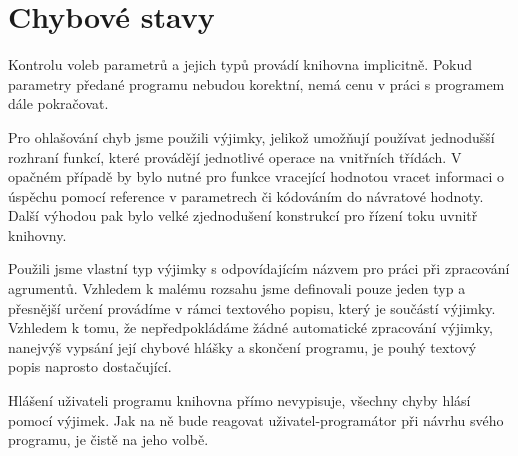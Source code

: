 \documentclass[a4paper,10pt]{article}
\begin{document}
\section*{Chybové stavy}

Kontrolu voleb parametrů a jejich typů provádí knihovna implicitně. Pokud parametry předané programu nebudou
korektní, nemá cenu v práci s programem dále pokračovat.

Pro ohlašování chyb jsme použili výjimky, jelikož umožňují používat jednodušší rozhraní funkcí, které provádějí
jednotlivé operace na vnitřních třídách. V opačném případě by bylo nutné pro funkce vracející hodnotou vracet
informaci o úspěchu pomocí reference v parametrech či kódováním do návratové hodnoty. Další výhodou pak bylo
velké zjednodušení konstrukcí pro řízení toku uvnitř knihovny.

Použili jsme vlastní typ výjimky s odpovídajícím názvem pro práci při zpracování agrumentů.
Vzhledem k malému rozsahu jsme definovali pouze jeden typ a přesnější určení provádíme v rámci textového popisu,
který je součástí výjimky. Vzhledem k tomu, že nepředpokládáme žádné automatické zpracování výjimky, nanejvýš
vypsání její chybové hlášky a skončení programu, je pouhý textový popis naprosto dostačující.

Hlášení uživateli programu knihovna přímo nevypisuje, všechny chyby hlásí pomocí výjimek. Jak na ně bude reagovat
uživatel-programátor při návrhu svého programu, je čistě na jeho volbě.
\end{document}
